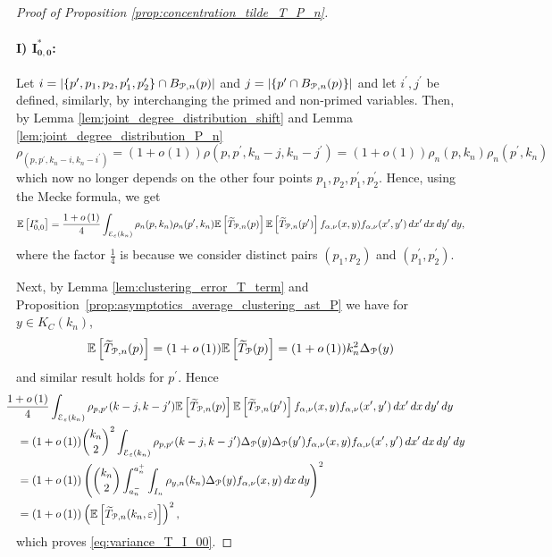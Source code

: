 \begin{proof}[Proof of Proposition \ref{prop:concentration_tilde_T_P_n}]
\vspace{5pt}

\paragraph{I) $\bm{I_{0,0}^\ast}$:}
Let $i = |\{p^\prime, p_1, p_2, p_1^\prime, p_2^\prime\} \cap B_{{\mathcal P},n}(p)|$ and $j = |\{p^\prime \cap B_{{\mathcal P},n}(p)\}|$ and let $i^\prime, j^\prime$ be defined, similarly, by interchanging the primed and non-primed variables. Then, by Lemma  \ref{lem:joint_degree_distribution_shift} and  Lemma \ref{lem:joint_degree_distribution_P_n}
\[
	\rho_(p,p^\prime, k_n-i,k_n-i^\prime) = (1+o(1))\rho(p,p^\prime, k_n-j,k_n-j^\prime) 
	= (1+o(1))\rho_{n}(p, k_n)\rho_{n}(p^\prime,k_n) 
\]
which now no longer depends on the other four points $p_1, p_2, p_1^\prime, p_2^\prime$. Hence, using the Mecke formula, we get
\[
	\mathbb{E}\left[I_{0,0}^\ast\right] = \frac{1 + o\left(1\right)}{4}\int_{\mathcal{E}_{\varepsilon}(k_n)}\rho_{n}(p, k_n)\rho_{n}(p^\prime,k_n)
		\mathbb{E}\left[\widetilde{T}_{{\mathcal P},n}(p)\right]\mathbb{E}\left[\widetilde{T}_{{\mathcal P},n}(p^\prime)\right] f_{\alpha,\nu}(x,y)
		f_{\alpha,\nu}(x^\prime,y^\prime) \, dx^\prime \, dx \, dy^\prime \, dy,
\]
where the factor $\frac{1}{4}$ is because we consider distinct pairs $(p_1,p_2)$ and $(p_1^\prime, p_2^\prime)$.

Next, by Lemma \ref{lem:clustering_error_T_term} and Proposition~\ref{prop:asymptotics_average_clustering_ast_P} we have for $y \in K_C(k_n)$,
\[
	\mathbb{E}\left[\widetilde{T}_{{\mathcal P},n}(p)\right] = (1+o\left(1\right))\mathbb{E}\left[\widetilde{T}_{{\mathcal P}}(p)\right] = (1 + o\left(1\right)) k_n^2 \Delta_{{\mathcal P}}(y)
\] 
and similar result holds for $p^\prime$. Hence 
\begin{align*}
	&\hspace{-10pt}\frac{1 + \smallO{1}}{4} \int_{\mathcal{E}_\varepsilon(k_n)} \rho_{p,p^\prime}(k-j,k-j^\prime)
		\Exp{\widetilde{T}_{\Pcal,n}(p)}\Exp{\widetilde{T}_{\Pcal,n}(p^\prime)} f_{\alpha,\nu}(x,y)
		f_{\alpha,\nu}(x^\prime,y^\prime) \, dx^\prime \, dx \, dy^\prime \, dy\\
	&= (1+\smallO{1})\binom{k_n}{2}^2 \int_{\mathcal{E}_\varepsilon(k_n)} 
		\rho_{p,p^\prime}(k-j,k-j^\prime) \Delta_{\Pcal}(y) \Delta_\Pcal(y^\prime) 	f_{\alpha,\nu}(x,y) 
		f_{\alpha,\nu}(x^\prime,y^\prime) \, dx^\prime \, dx \, dy^\prime \, dy\\
	&= (1+\smallO{1}) \left( \binom{k_n}{2} \int_{a_n^-}^{a_n^+}\int_{I_n} \rho_{y,n}(k_n)
		\Delta_{\Pcal}(y) f_{\alpha,\nu}(x,y) \, dx \, dy\right)^2\\
	&= (1 + \smallO{1})\left(\Exp{\widetilde{T}_{\Pcal,n}(k_n,\varepsilon)}\right)^2,
\end{align*}
which proves \eqref{eq:variance_T_I_00}.


\end{proof}
